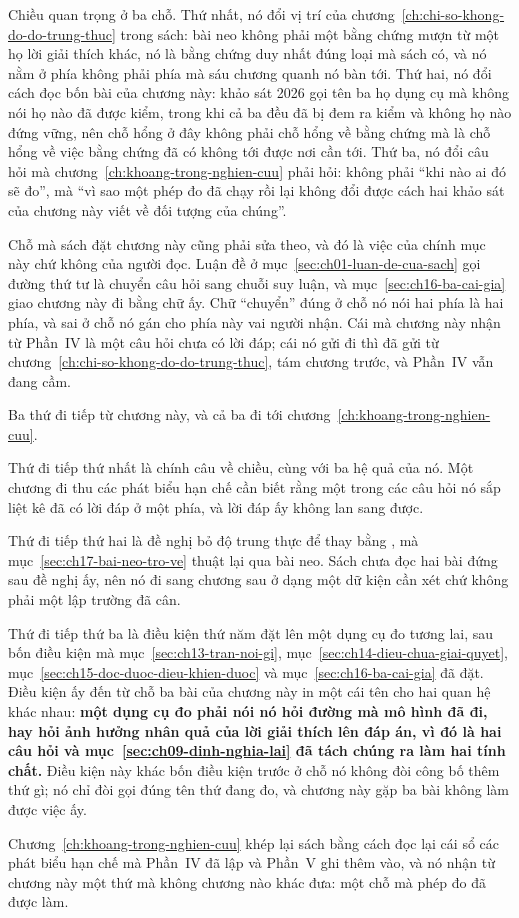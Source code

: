 %
Chiều quan trọng ở ba chỗ. Thứ nhất, nó đổi vị trí của
chương~\ref{ch:chi-so-khong-do-do-trung-thuc} trong sách: bài neo không phải một
bằng chứng mượn từ một họ lời giải thích khác, nó là bằng chứng duy nhất đúng
loại mà sách có, và nó nằm ở phía không phải phía mà sáu chương quanh nó bàn tới.
Thứ hai, nó đổi cách đọc bốn bài của chương này: khảo sát 2026 gọi tên ba họ
dụng cụ mà không nói họ nào đã được kiểm, trong khi cả ba đều đã bị đem ra kiểm
và không họ nào đứng vững, nên chỗ hổng ở đây không phải chỗ hổng về bằng chứng
mà là chỗ hổng về việc bằng chứng đã có không tới được nơi cần tới. Thứ
ba, nó đổi câu hỏi mà chương~\ref{ch:khoang-trong-nghien-cuu} phải hỏi: không
phải \enquote{khi nào ai đó sẽ đo}, mà \enquote{vì sao một phép đo đã chạy rồi
lại không đổi được cách hai khảo sát của chương này viết về đối tượng của
chúng}.

%
Chỗ mà sách đặt chương này cũng phải sửa theo, và đó là việc của chính mục này
chứ không của người đọc. Luận đề ở mục~\ref{sec:ch01-luan-de-cua-sach} gọi đường
thứ tư là chuyển câu hỏi sang chuỗi suy luận, và
mục~\ref{sec:ch16-ba-cai-gia} giao chương này đi bằng chữ ấy. Chữ \enquote{chuyển}
đúng ở chỗ nó nói hai phía là hai phía, và sai ở chỗ nó gán cho phía này vai
người nhận. Cái mà chương này nhận từ Phần~IV là một câu hỏi chưa có lời đáp;
cái nó gửi đi thì đã gửi từ chương~\ref{ch:chi-so-khong-do-do-trung-thuc}, tám
chương trước, và Phần~IV vẫn đang cầm.

%
Ba thứ đi tiếp từ chương này, và cả ba đi tới
chương~\ref{ch:khoang-trong-nghien-cuu}.

Thứ đi tiếp thứ nhất là chính câu về chiều, cùng với ba hệ quả của nó. Một
chương đi thu các phát biểu hạn chế cần biết rằng một trong các câu hỏi nó sắp
liệt kê đã có lời đáp ở một phía, và lời đáp ấy không lan sang được.

Thứ đi tiếp thứ hai là đề nghị bỏ độ trung thực để thay bằng
, mà mục~\ref{sec:ch17-bai-neo-tro-ve}
thuật lại qua bài neo. Sách chưa đọc hai bài
đứng sau đề nghị ấy, nên nó đi sang chương sau ở dạng một dữ kiện cần xét chứ
không phải một lập trường đã cân.

Thứ đi tiếp thứ ba là điều kiện thứ năm đặt lên một dụng cụ đo tương lai, sau bốn
điều kiện mà mục~\ref{sec:ch13-tran-noi-gi}, mục~\ref{sec:ch14-dieu-chua-giai-quyet},
mục~\ref{sec:ch15-doc-duoc-dieu-khien-duoc} và mục~\ref{sec:ch16-ba-cai-gia} đã
đặt. Điều kiện ấy đến từ chỗ ba bài của chương này in một cái tên cho hai quan hệ
khác nhau: \textbf{một dụng cụ đo phải nói nó hỏi đường mà mô hình đã đi, hay hỏi
ảnh hưởng nhân quả của lời giải thích lên đáp án, vì đó là hai câu hỏi và
mục~\ref{sec:ch09-dinh-nghia-lai} đã tách chúng ra làm hai tính chất.} Điều kiện này khác bốn
điều kiện trước ở chỗ nó không đòi công bố thêm thứ gì; nó chỉ đòi gọi đúng tên
thứ đang đo, và chương này gặp ba bài không làm được việc ấy.

%
Chương~\ref{ch:khoang-trong-nghien-cuu} khép lại sách bằng cách đọc lại cái sổ
các phát biểu hạn chế mà Phần~IV đã lập và Phần~V ghi thêm vào, và nó nhận từ
chương này một thứ mà không chương nào khác đưa: một chỗ mà phép đo đã được làm.
